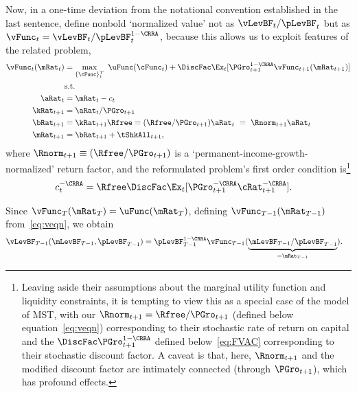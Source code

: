 \documentclass[BufferStockTheory]{subfiles}
\begin{document}
Now, in a one-time deviation from the notational convention established in the last sentence, define nonbold `normalized value' not as $\vLevBF_{t}/\pLevBF_{t}$ but as $\vFunc_{t} = \vLevBF_{t}/\pLevBF_{t}^{1-\CRRA}$, because this allows us to exploit features of the related problem,
\begin{equation}\label{eq:veqn}
  \begin{split}
    \vFunc_{t}(\mRat_{t})  & = \max_{{\{\cFunc\}}_{t}^{T}}~  \uFunc(\cFunc_{t}) +\DiscFac \Ex_{t}[\PGro_{t+1}^{1-\CRRA}\vFunc_{t+1}({\mRat}_{t+1})]  \\
                           & \mbox{s.t.}  
    \\ {\aRat}_{t}  & = \mRat_{t}-c_{t}  
    \\ {\kRat}_{t+1} & = \aRat_{t}/\PGro_{t+1}  
    \\ {\bRat}_{t+1}  & = {\kRat}_{t+1}\Rfree = (\Rfree/\PGro_{t+1})\aRat_{t}  ~ = ~ \Rnorm_{t+1}\aRat_{t}  
    \\ \mRat_{t+1}  & = \bRat_{t+1}+\tShkAll_{t+1}  , %
  \end{split}
\end{equation}
where $\Rnorm_{t+1}\equiv (\Rfree/\PGro_{t+1})$ is a `permanent-income-growth-normalized' return factor, and the reformulated problem's first order condition is\footnote{Leaving aside their assumptions about the marginal utility function and liquidity constraints, it is tempting to view this as a special case of the model of MST, with our $\Rnorm_{t+1}=\Rfree/\PGro_{t+1}$ (defined below equation~\eqref{eq:veqn}) corresponding to their stochastic rate of return on capital and the {\FVAF} $\DiscFac \PGro_{t+1}^{1-\CRRA}$ defined below~\eqref{eq:FVAC} corresponding to their stochastic discount factor.  A caveat is that, here, $\Rnorm_{t+1}$ and the modified discount factor are intimately connected (through $\PGro_{t+1}$), which has profound effects.}%
\begin{align}
  c_{t}^{-\CRRA}  & = \Rfree \DiscFac \Ex_{t}[ {\PGro}_{t+1}^{-\CRRA} {\cRat}
                    _{t+1}^{-\CRRA}].  \label{eq:scaledeuler}
\end{align}

Since $\vFunc_{T}(\mRat_{T}) = \uFunc(\mRat_{T})$, defining $\vFunc_{T-1}(\mRat_{T-1})$ from~\eqref{eq:veqn}, we obtain
\begin{align*}
  \vLevBF_{T-1}(\mLevBF_{T-1},\pLevBF_{T-1})  & = \pLevBF_{T-1}^{1-\CRRA} \vFunc_{T-1}(\underbrace{\mLevBF_{T-1}/\pLevBF_{T-1}}_{=\mRat_{T-1}}).
\end{align*}
\end{document}
